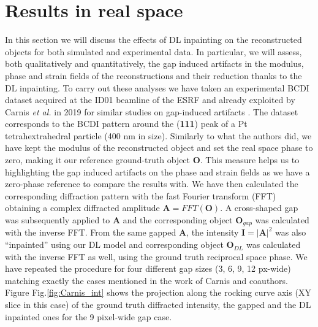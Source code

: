 \section{Results in real space}\label{sec:res_real}

In this section we will discuss the effects of DL inpainting on the reconstructed objects for both simulated and experimental 
data. In particular, we will assess, both qualitatively and quantitatively, the gap induced artifacts in 
the modulus, phase and strain fields of the reconstructions and their reduction thanks to the DL inpainting. To carry out
these analyses we have taken an experimental BCDI dataset acquired at the ID01 beamline of the ESRF and already exploited by 
Carnis \textit{et al.} in 2019 for similar studies on gap-induced artifacts \cite{carnis_towards_2019}. The dataset 
corresponds to the BCDI pattern around the (\textbf{111}) peak of a Pt tetrahextrahedral particle (400 nm in size). 
Similarly to what the authors did, we have kept the modulus of the reconstructed object and set the real space phase
to zero, making it our reference ground-truth object $\textbf{O}$. This measure helps us to highlighting the gap induced artifacts on the phase and strain fields as we have a zero-phase 
reference to compare the results with. We have then calculated the corresponding diffraction pattern with the fast 
Fourier transform (FFT) obtaining a complex diffracted amplitude $\textbf{A}=FFT(\textbf{O})$. A cross-shaped gap was 
subsequently applied to $\textbf{A}$ and the corresponding object $\textbf{O}_{gap}$ was calculated with the inverse FFT.
From the same gapped $\textbf{A}$, the intensity $\textbf{I} = |\textbf{A}|^2$ was also ``inpainted'' using our DL model and corresponding object $\textbf{O}_{DL}$ was 
calculated with the inverse FFT as well, using the ground truth reciprocal space phase. We have repeated the procedure for four different gap sizes (3, 6, 9, 12 px-wide)
matching exactly the cases mentioned in the work of Carnis and coauthors. Figure Fig.\ref{fig:Carnis_int} shows the projection
along the rocking curve axis (XY slice in this case) of the ground truth diffracted intensity, the gapped and the DL inpainted ones for the 
9 pixel-wide gap case.

